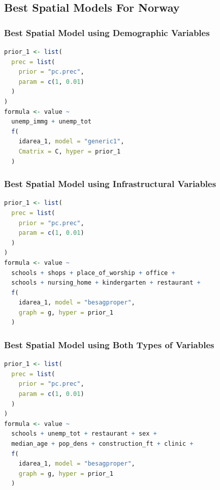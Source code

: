 \subsection{Best Spatial Models For Norway}
\subsubsection{Best Spatial Model using Demographic Variables}
\begin{lstlisting}[caption={The code for the demographic model.}, label={codeDemoNorway}, language = R]
prior_1 <- list(
  prec = list(
    prior = "pc.prec",
    param = c(1, 0.01)
  )
)
formula <- value ~
  unemp_immg + unemp_tot
  f(
    idarea_1, model = "generic1",
    Cmatrix = C, hyper = prior_1
  )
\end{lstlisting}
\subsubsection{Best Spatial Model using Infrastructural Variables}
\begin{lstlisting}[caption={The code for the infrastructural model.}, label={codeInfraNorway}, language = R]
prior_1 <- list(
  prec = list(
    prior = "pc.prec",
    param = c(1, 0.01)
  )
)
formula <- value ~
  schools + shops + place_of_worship + office +
  schools + nursing_home + kindergarten + restaurant +
  f(
    idarea_1, model = "besagproper",
    graph = g, hyper = prior_1
  )
\end{lstlisting}
\subsubsection{Best Spatial Model using Both Types of Variables}
\begin{lstlisting}[caption={The code for the demographic + infrastructure model.}, label={codeBothNorway}, language=R]
prior_1 <- list(
  prec = list(
    prior = "pc.prec",
    param = c(1, 0.01)
  )
)
formula <- value ~
  schools + unemp_tot + restaurant + sex + 
  median_age + pop_dens + construction_ft + clinic +
  f(
    idarea_1, model = "besagproper",
    graph = g, hyper = prior_1
  )
\end{lstlisting}
\clearpage